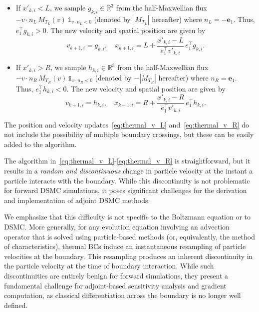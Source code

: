 \documentclass[12pt,nopreprintline]{elsarticle}
\begin{document}
\begin{itemize}
    \item If $x'_{k,i} < L$, we sample $g_{k,i} \in \mathbb{R}^3$ from the half-Maxwellian flux
    $-v \cdot n_L \, M_{T_L}(v) \, \mathds{1}_{v \cdot n_L < 0}$ (denoted by $|M_{T_L}|$ hereafter) where $n_L = -\textbf{e}_1$.
    Thus, $e_1^\top g_{k,i} > 0$. The new velocity and spatial position are given by
    \begin{equation}
    \label{eq:thermal_v_L}
    v_{k+1,i} = g_{k,i}, \quad
    x_{k+1,i} = L + \frac{x'_{k,i} - L}{e_1^\top v'_{k,i}} \, e_1^\top g_{k,i}.
    \end{equation}

    \item If $x'_{k,i} > R$, we sample $h_{k,i} \in \mathbb{R}^3$ from the half-Maxwellian flux
    $-v \cdot n_R \, M_{T_R}(v) \, \mathds{1}_{v \cdot n_R < 0}$ (denoted by $-|M_{T_R}|$ hereafter) where $n_R = \textbf{e}_1$.
    Thus, $e_1^\top h_{k,i} < 0$. The new velocity and spatial position are given by
    \begin{equation}
    \label{eq:thermal_v_R}
    v_{k+1,i} = h_{k,i}, \quad
    x_{k+1,i} = R + \frac{x'_{k,i} - R}{e_1^\top v'_{k,i}} \, e_1^\top h_{k,i}.
    \end{equation}
\end{itemize}
The position and velocity updates~\eqref{eq:thermal_v_L}  and~\eqref{eq:thermal_v_R} do not include the possibility of multiple boundary crossings, but these can be easily added to the algorithm.

The algorithm in~\eqref{eq:thermal_v_L}-\eqref{eq:thermal_v_R} is straightforward, but it results in a \emph{random and  discontinuous} change in particle velocity at the instant a particle interacts with the boundary. While this discontinuity is not problematic for forward DSMC simulations, it poses significant challenges for the derivation and implementation of adjoint DSMC methods.

We emphasize that this difficulty is not specific to the Boltzmann equation or to DSMC. More generally, for any evolution equation involving an advection operator that is solved using particle-based methods (or, equivalently, the method of characteristics), thermal BCs induce an instantaneous resampling of particle velocities at the boundary. This resampling produces an inherent discontinuity in the particle velocity at the time of boundary interaction. While such discontinuities are entirely benign for forward simulations, they present a fundamental challenge for adjoint-based sensitivity analysis and gradient computation, as classical differentiation across the boundary is no longer well defined.
\end{document}
